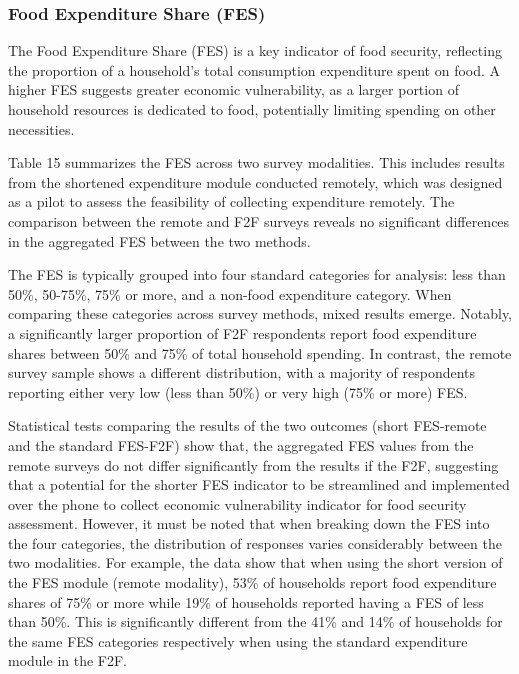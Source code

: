 \documentclass[11pt,harvard]{article}
\begin{document}
	
	\subsubsection{Food Expenditure Share (FES)}
	
	The Food Expenditure Share (FES) is a key indicator of food security, reflecting the proportion of a household's total consumption expenditure spent on food. A higher FES suggests greater economic vulnerability, as a larger portion of household resources is dedicated to food, potentially limiting spending on other necessities.

	Table 15 summarizes the FES across two survey modalities. This includes results from the shortened expenditure module conducted remotely, which was designed as a pilot to assess the feasibility of collecting expenditure remotely. The comparison between the remote and F2F surveys reveals no significant differences in the aggregated FES between the two methods.
	
	The FES is typically grouped into four standard categories for analysis: less than 50\%, 50-75\%, 75\% or more, and a non-food expenditure category. When comparing these categories across survey methods, mixed results emerge. Notably, a significantly larger proportion of F2F respondents report food expenditure shares between 50\% and 75\% of total household spending. In contrast, the remote survey sample shows a different distribution, with a majority of respondents reporting either very low (less than 50\%) or very high (75\% or more) FES.
	
	Statistical tests comparing the results of the two outcomes (short FES-remote and the standard FES-F2F) show that, the aggregated FES values from the remote surveys do not differ significantly from the results if the F2F, suggesting that a potential for the shorter FES indicator to be streamlined and implemented over the phone to collect economic vulnerability indicator for food security assessment. However, it must be noted that when breaking down the FES into the four categories, the distribution of responses varies considerably between the two modalities. For example, the data show that when using the short version of the FES module (remote modality), 53\% of households report food expenditure shares of 75\% or more while 19\% of households reported having a FES of less than 50\%. This is significantly different from the 41\% and 14\% of households for the same FES categories respectively when using the standard expenditure module in the F2F.
	
\end{document}
